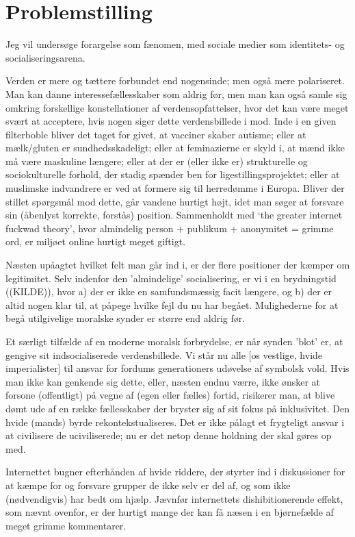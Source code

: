 \section{Problemstilling}

Jeg vil undersøge forargelse som fænomen, med sociale medier som
identitets- og socialiseringsarena.

Verden er mere og tættere forbundet end nogensinde; men også mere
polariseret. Man kan danne interessefællesskaber som aldrig før, men man
kan også samle sig omkring forskellige konstellationer af
verdensopfattelser, hvor det kan være meget svært at acceptere, hvis nogen
siger dette verdensbillede i mod. Inde i en given filterboble bliver det
taget for givet, at vacciner skaber autisme; eller at mælk/gluten er
sundhedsskadeligt; eller at feminazierne er skyld i, at mænd ikke må være
maskuline længere; eller at der er (eller ikke er) strukturelle og
sociokulturelle forhold, der stadig spænder ben for
ligestillingsprojektet; eller at muslimske indvandrere er ved at formere
sig til herredømme i Europa. Bliver der stillet spørgsmål mod dette, går
vandene hurtigt højt, idet man søger at forsvare sin (åbenlyst korrekte,
forstås) position. Sammenholdt med ‘the greater internet fuckwad theory’,
hvor almindelig person + publikum + anonymitet = grimme ord, er miljøet
online hurtigt meget giftigt.

Næsten upåagtet hvilket felt man går ind i, er der flere positioner der
kæmper om legitimitet. Selv indenfor den 'almindelige' socialisering, er
vi i en brydningstid ((KILDE)), hvor a) der er ikke en samfundsmæssig
facit længere, og b) der er altid nogen klar til, at påpege hvilke fejl du
nu har begået. Mulighederne for at begå utilgivelige moralske synder er
større end aldrig før. 

Et særligt tilfælde af en moderne moralsk forbrydelse, er når synden
'blot' er, at gengive sit indsocialiserede verdensbillede. Vi står nu alle
[os vestlige, hvide imperialister] til ansvar for fordums generationers
udøvelse af symbolsk vold. Hvis man ikke kan genkende sig dette, eller,
næsten endnu værre, ikke ønsker at forsone (offentligt) på vegne af (egen
eller fælles) fortid, risikerer man, at blive dømt ude af en række
fællesskaber der bryster sig af sit fokus på inklusivitet. Den hvide (mands)
byrde rekontekstualiseres. Det er ikke pålagt et frygteligt ansvar i at
civilisere de uciviliserede; nu er det netop denne holdning der skal gøres op
med.

Internettet bugner efterhånden af hvide riddere, der styrter ind
i diskussioner for at kæmpe for og forsvare grupper de ikke selv er del af, og
som ikke (nødvendigvis) har bedt om hjælp. Jævnfør internettets
dishibitionerende effekt, som nævnt ovenfor, er der hurtigt mange der kan få
næsen i en bjørnefælde af meget grimme kommentarer.

